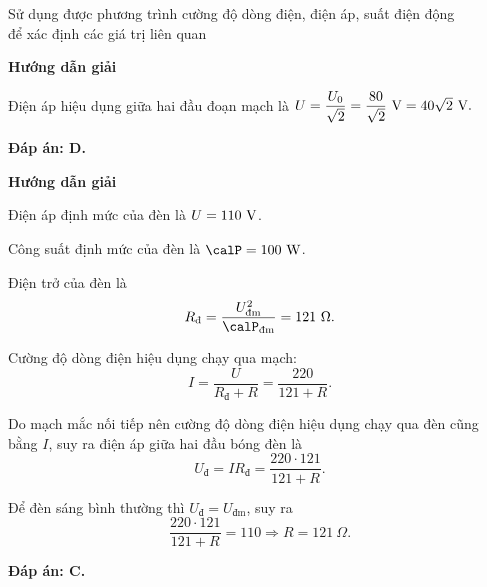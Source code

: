 \begin{dang}{Sử dụng được phương trình cường độ dòng điện, điện áp, suất điện động\\ để xác định các giá trị liên quan}
	
	
	{\begin{center}
			\textbf{Hướng dẫn giải}
		\end{center}
		
		Điện áp hiệu dụng giữa hai đầu đoạn mạch là
		$U = \dfrac{U_0}{\sqrt 2}=\dfrac{80}{\sqrt 2}\ \text V = 40\sqrt 2\ \text V.$
		
		\textbf{Đáp án: D.}
	}
	
	{\begin{center}
			\textbf{Hướng dẫn giải}
		\end{center}
		
		Điện áp định mức của đèn là $U=110\ \text V$.
		
		Công suất định mức của đèn là $\calP = 100\ \text W$.
		
		Điện trở của đèn là
		$$R_\text{đ}=\dfrac{U_\text{đm}^2}{\calP_\text{đm}} = 121\ \Omega.$$
		
		
		Cường độ dòng điện hiệu dụng chạy qua mạch:
		$$I=\dfrac{U}{R_\text{đ} + R} = \dfrac{220}{121+R}.$$
		
		
		Do mạch mắc nối tiếp nên cường độ dòng điện hiệu dụng chạy qua đèn cũng bằng $I$, suy ra điện áp giữa hai đầu bóng đèn là
		$$U_\text{đ} = IR_\text{đ} = \dfrac{220\cdot121}{121+R}.$$
		
		
		Để đèn sáng bình thường thì $U_\text{đ}=U_\text{đm}$, suy ra
		$$	\dfrac{220\cdot121}{121+R} = 110 \Rightarrow R = 121\ \Omega.$$
		
		\textbf{Đáp án: C.}
	}
	
\end{dang}
